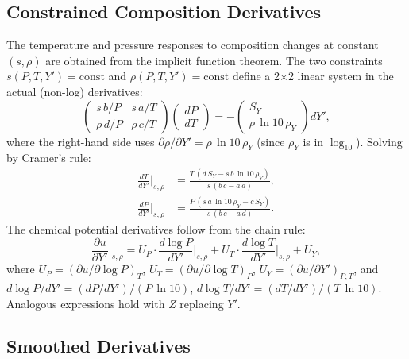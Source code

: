 \documentclass[twocolumn]{aastex701}
\begin{document}
\subsection{Constrained Composition Derivatives}\label{sec:constrained}

The temperature and pressure responses to composition changes at constant $(s, \rho)$ are obtained from the implicit function theorem.
The two constraints $s(P, T, Y') = \text{const}$ and $\rho(P, T, Y') = \text{const}$ define a 2$\times$2 linear system in the actual (non-log) derivatives:
\begin{equation}
    \begin{pmatrix} s\,b/P & s\,a/T \\ \rho\,d/P & \rho\,c/T \end{pmatrix}
    \begin{pmatrix} dP \\ dT \end{pmatrix}
    = -\begin{pmatrix} S_Y \\ \rho\,\ln 10\,\rho_Y \end{pmatrix} dY',
\end{equation}
where the right-hand side uses $\partial\rho/\partial Y' = \rho\,\ln 10\,\rho_Y$ (since $\rho_Y$ is in $\log_{10}$).
Solving by Cramer's rule:
\begin{align}
    \frac{dT}{dY'}\bigg|_{s,\rho} &= \frac{T\,(d\,S_Y - s\,b\,\ln 10\,\rho_Y)}{s\,(b\,c - a\,d)}, \label{eq:dTdY_srho} \\[4pt]
    \frac{dP}{dY'}\bigg|_{s,\rho} &= \frac{P\,(s\,a\,\ln 10\,\rho_Y - c\,S_Y)}{s\,(b\,c - a\,d)}. \label{eq:dPdY_srho}
\end{align}
The chemical potential derivatives follow from the chain rule:
\begin{equation}\label{eq:dUdY_srho}
    \frac{\partial u}{\partial Y'}\bigg|_{s,\rho} = U_P \cdot \frac{d\log P}{dY'}\bigg|_{s,\rho} + U_T \cdot \frac{d\log T}{dY'}\bigg|_{s,\rho} + U_Y,
\end{equation}
where $U_P = (\partial u/\partial\log P)_T$, $U_T = (\partial u/\partial\log T)_P$, $U_Y = (\partial u/\partial Y')_{P,T}$, and
$d\log P/dY' = (dP/dY')/(P\,\ln 10)$, $d\log T/dY' = (dT/dY')/(T\,\ln 10)$.
Analogous expressions hold with $Z$ replacing $Y'$.

\subsection{Smoothed Derivatives}\label{sec:savgol}
\end{document}
